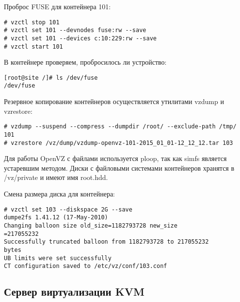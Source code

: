 Проброс FUSE для контейнера 101:
\begin{lstlisting}
# vzctl stop 101
# vzctl set 101 --devnodes fuse:rw --save
# vzctl set 101 --devices c:10:229:rw --save
# vzctl start 101
\end{lstlisting}

В контейнере проверяем, пробросилось ли устройство:
\begin{lstlisting}
[root@site /]# ls /dev/fuse
/dev/fuse
\end{lstlisting}

Резервное копирование контейнеров осуществляется утилитами vzdump и vzrestore:
\begin{lstlisting}
# vzdump --suspend --compress --dumpdir /root/ --exclude-path /tmp/ 101
# vzrestore /vz/dump/vzdump-openvz-101-2015_01_01-12_12_12.tar 103
\end{lstlisting}

Для работы OpenVZ с файлами используется ploop, так как simfs является устаревшим методом.
Диски с файловыми системами контейнеров хранятся в /vz/private и имеют имя root.hdd.

Смена размера диска для контейнера:
\begin{lstlisting}
# vzctl set 103 --diskspace 2G --save
dumpe2fs 1.41.12 (17-May-2010)
Changing balloon size old_size=1182793728 new_size
=217055232
Successfully truncated balloon from 1182793728 to 217055232
bytes
UB limits were set successfully
CT configuration saved to /etc/vz/conf/103.conf
\end{lstlisting}

\subsection{Сервер виртуализации KVM}

\clearpage
